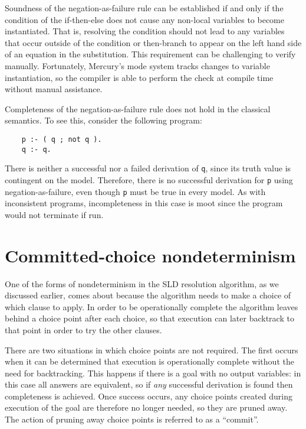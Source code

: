 
Soundness\label{gi:soundness2}
of the negation-as-failure rule
can be established if and only if
the condition of the if-then-else
does not cause any non-local variables to become instantiated.
That is, resolving the condition
should not lead to any variables
that occur outside of the condition or then-branch
to appear on the left hand side of an equation in the substitution.
This requirement can be challenging to verify manually.
Fortunately,
Mercury's mode system tracks changes to variable instantiation,
so the compiler is able to perform the check at compile time
without manual assistance.

Completeness\label{gi:completeness2}
of the negation-as-failure rule
does not hold in the classical semantics.
To see this,
consider the following program:
\begin{verbatim}
    p :- ( q ; not q ).
    q :- q.
\end{verbatim}
There is neither a successful nor a failed derivation of \texttt{q},
since its truth value is contingent on the model.
Therefore, there is no successful derivation for \texttt{p}
using negation-as-failure,
even though \texttt{p} must be true in every model.
As with inconsistent programs,
incompleteness in this case is moot
since the program would not terminate if run.


\section{Committed-choice nondeterminism}
\label{sec:committed-choice}

One of the forms of nondeterminism in the SLD resolution algorithm,
as we discussed earlier,
comes about because the algorithm needs to make a choice
of which clause to apply.
In order to be operationally complete
the algorithm leaves behind a choice point after each choice,
so that execution can later backtrack to that point
in order to try the other clauses.

There are two situations in which choice points are not required.
The first occurs when it can be determined that execution is
operationally complete without the need for backtracking.
This happens if there is a goal with no output variables:
in this case all answers are equivalent,
so if \emph{any} successful derivation is found
then completeness is achieved.
Once success occurs,
any choice points created during execution of the goal
are therefore no longer needed,
so they are pruned away.
The action of pruning away choice points
is referred to as a ``commit\label{gi:commit}''.

